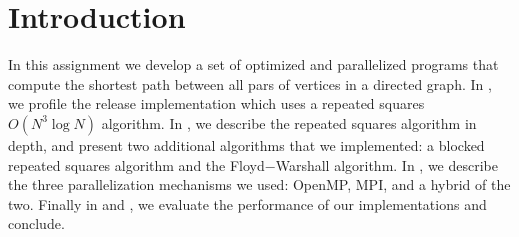 \section{Introduction}\label{sec:intro}
In this assignment we develop a set of optimized and parallelized programs that
compute the shortest path between all pars of vertices in a directed graph. In
, we profile the release implementation which uses a repeated
squares $O(N^3 \log N)$ algorithm. In , we describe the repeated
squares algorithm in depth, and present two additional algorithms that we
implemented: a blocked repeated squares algorithm and the Floyd$-$Warshall
algorithm. In , we describe the three parallelization
mechanisms we used: OpenMP, MPI, and a hybrid of the two. Finally in
 and , we evaluate the performance of our
implementations and conclude.
